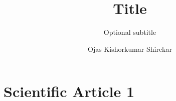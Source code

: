 \documentclass[whitelogo]{TUD-report2020}
\begin{document}
\frontmatter


\title[tudelft-white]{Title}
\subtitle[tudelft-white]{Optional subtitle}
\author[tudelft-white]{Ojas Kishorkumar Shirekar}
\makecover[split]






\tableofcontents

\mainmatter

\chapter{Scientific Article 1}















\appendix

%

\printbibliography
\end{document}
